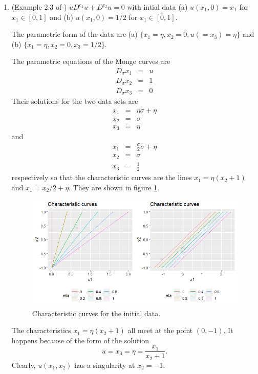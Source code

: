 \documentclass{article}
\theoremstyle{plain}
\numberwithin{thm}{section}
\theoremstyle{plain}
\numberwithin{prop}{section}
\theoremstyle{definition}
\numberwithin{defn}{section}
\theoremstyle{remark}
\numberwithin{equation}{section}
\begin{document}
\begin{enumerate}
\item (Example 2.3 of \cite{pprr}) $uD^{e_1}u + D^{e_2}u = 0$ with intial data (a) $u(x_1, 0) = x_1$
for $x_1 \in [0, 1]$ and (b) $u(x_1, 0) = 1/2$ for $x_1 \in [0, 1]$.

The parametric form of the data are (a) $\{x_1 = \eta, x_2 = 0, u (=x_3) = \eta\}$ and (b) $\{x_1 = 
\eta, x_2 = 0, x_3 = 1/2\}$.

The parametric equations of the Monge curves are
\begin{eqnarray*}
D_\sigma x_1 &=& u \\
D_\sigma x_2 &=& 1 \\
D_\sigma x_3 &=& 0
\end{eqnarray*}
Their solutions for the two data sets are
\begin{eqnarray*}
x_1 &=& \eta\sigma + \eta \\
x_2 &=& \sigma \\
x_3 &=& \eta
\end{eqnarray*}
and
\begin{eqnarray*}
x_1 &=& \frac{\sigma}{2}\sigma + \eta\\
x_2 &=& \sigma \\
x_3 &=& \frac{1}{2}
\end{eqnarray*}
respectively so that the characteristic curves are the lines $x_1 = \eta(x_2 + 1)$ and $x_1 = 
x_2/2 + \eta$. They are shown in figure \ref{f3}.
\begin{figure}
\centering
\includegraphics[scale=0.75]{cnf1}
\caption{Characteristic curves for the initial data.}
\label{f3}
\end{figure}

The characteristics $x_1 = \eta(x_2 + 1)$ all meet at the point $(0, -1)$. It happens because of the
form of the solution
\[
u = x_3 = \eta = \frac{x_1}{x_2 + 1}.
\]
Clearly, $u(x_1, x_2)$ has a singularity at $x_2 = -1$.


\end{enumerate}
\end{document}
